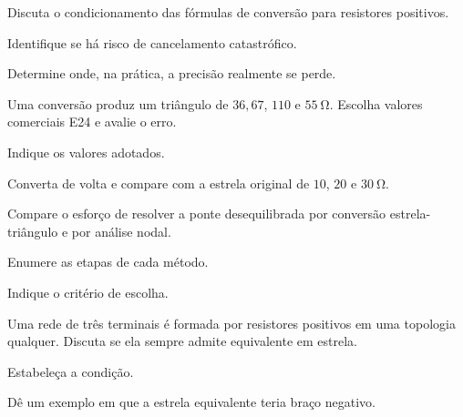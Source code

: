 \begin{questao}[3]{}

Discuta o condicionamento das fórmulas de conversão para resistores positivos.
\begin{itensq}
\item Identifique se há risco de cancelamento catastrófico.
\item Determine onde, na prática, a precisão realmente se perde.
\end{itensq}


\end{questao}
\begin{questao}[3]{}

Uma conversão produz um triângulo de $36{,}67$, $110$ e $\SI{55}{\ohm}$.
Escolha valores comerciais E24 e avalie o erro.
\begin{itensq}
\item Indique os valores adotados.
\item Converta de volta e compare com a estrela original de $10$, $20$ e
      $\SI{30}{\ohm}$.
\end{itensq}


\end{questao}
\begin{questao}[3]{}

Compare o esforço de resolver a ponte desequilibrada por conversão
estrela-triângulo e por análise nodal.
\begin{itensq}
\item Enumere as etapas de cada método.
\item Indique o critério de escolha.
\end{itensq}


\end{questao}
\begin{questao}[3]{}

Uma rede de três terminais é formada por resistores positivos em uma topologia
qualquer. Discuta se ela sempre admite equivalente em estrela.
\begin{itensq}
\item Estabeleça a condição.
\item Dê um exemplo em que a estrela equivalente teria braço negativo.
\end{itensq}


\end{questao}

